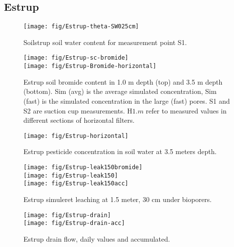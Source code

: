 \subsection*{Estrup}

\begin{figure}[htbp]
  \begin{center}
    \texttt{[image: fig/Estrup-theta-SW025cm]}
  \end{center}
  \caption{Soilstrup soil water content for measurement point S1.}
  \label{fig:Estrup-theta}
\end{figure}\FloatBarrier

\begin{figure}[htbp]
  \begin{center}
    \texttt{[image: fig/Estrup-sc-bromide]}\\
    \texttt{[image: fig/Estrup-Bromide-horizontal]}
  \end{center}
  \caption{Estrup soil bromide content in 1.0 m depth (top) and 3.5
    m depth (bottom).  Sim (avg) is the average simulated
    concentration, Sim (fast) is the simulated concentration in the
    large (fast) pores.  S1 and S2 are suction cup measurements.
    H$1$.$m$ refer to measured values in different sections of
    horizontal filters.}
  \label{fig:Estrup-bromide}
\end{figure}\FloatBarrier


\begin{figure}[htbp]
  \begin{center}
    \texttt{[image: fig/Estrup-horizontal]}
  \end{center}
  \caption{Estrup pesticide concentration in soil water at 3.5 meters
    depth.}
  \label{fig:Estrup-horizontal}
\end{figure}\FloatBarrier

\begin{figure}[htbp]
  \begin{center}
    \texttt{[image: fig/Estrup-leak150bromide]}\\
    \texttt{[image: fig/Estrup-leak150]}\\
    \texttt{[image: fig/Estrup-leak150acc]}
  \end{center}
  \caption{Estrup simuleret leaching at 1.5 meter, 30 cm under bioporers.}
  \label{fig:Estrup-leak150}
\end{figure}\FloatBarrier

\begin{figure}[htbp]
  \begin{center}
    \texttt{[image: fig/Estrup-drain]}\\
    \texttt{[image: fig/Estrup-drain-acc]}
  \end{center}
  \caption{Estrup drain flow, daily values and accumulated.}
  \label{fig:Estrup-drain}
\end{figure}\FloatBarrier

